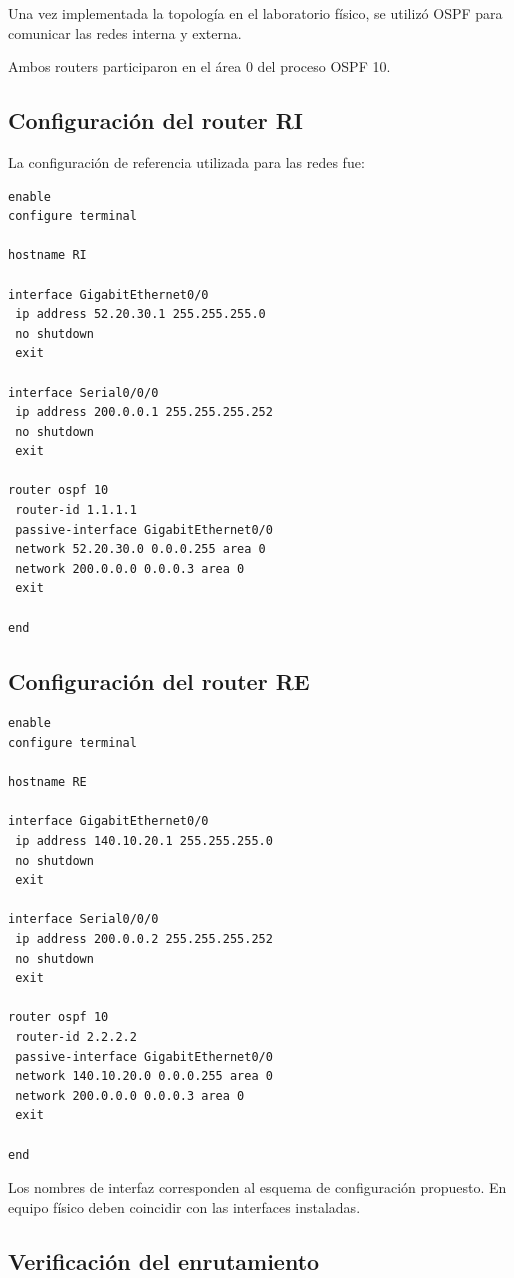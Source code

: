 \documentclass[12pt,a4paper]{article}
\begin{document}
Una vez implementada la topología
en el laboratorio físico, se utilizó
OSPF para comunicar las redes
interna y externa.

Ambos routers participaron en
el área 0 del proceso OSPF 10.

\subsection{Configuración del router RI}

La configuración de referencia
utilizada para las redes fue:

\begin{lstlisting}
enable
configure terminal

hostname RI

interface GigabitEthernet0/0
 ip address 52.20.30.1 255.255.255.0
 no shutdown
 exit

interface Serial0/0/0
 ip address 200.0.0.1 255.255.255.252
 no shutdown
 exit

router ospf 10
 router-id 1.1.1.1
 passive-interface GigabitEthernet0/0
 network 52.20.30.0 0.0.0.255 area 0
 network 200.0.0.0 0.0.0.3 area 0
 exit

end
\end{lstlisting}

\subsection{Configuración del router RE}

\begin{lstlisting}
enable
configure terminal

hostname RE

interface GigabitEthernet0/0
 ip address 140.10.20.1 255.255.255.0
 no shutdown
 exit

interface Serial0/0/0
 ip address 200.0.0.2 255.255.255.252
 no shutdown
 exit

router ospf 10
 router-id 2.2.2.2
 passive-interface GigabitEthernet0/0
 network 140.10.20.0 0.0.0.255 area 0
 network 200.0.0.0 0.0.0.3 area 0
 exit

end
\end{lstlisting}

Los nombres de interfaz
corresponden al esquema de
configuración propuesto.
En equipo físico deben coincidir
con las interfaces instaladas.

\subsection{Verificación del enrutamiento}
\end{document}
